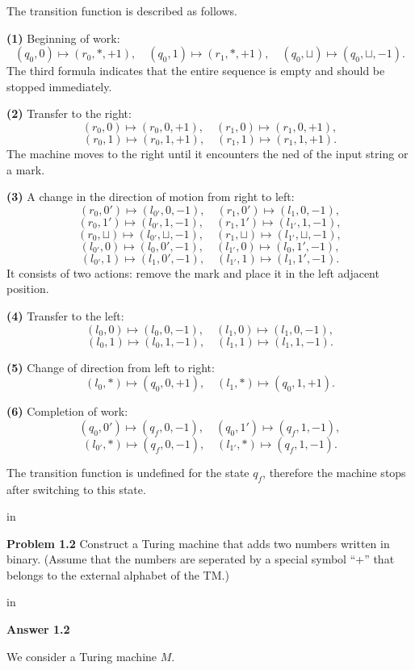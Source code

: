 \documentclass[11pt]{article}
\begin{document}
\newpage
The transition function is described as follows.

{\bf (1)} Beginning of work: 
$$
(q_0, 0) \mapsto (r_0, \ast, +1), \quad (q_0, 1)\mapsto (r_1, \ast, +1), \quad (q_0,\sqcup) \mapsto (q_0 ,\sqcup, -1).
$$
The third formula indicates that the entire sequence is empty and should be stopped immediately.

{\bf (2)} Transfer to the right: 
$$
(r_0, 0) \mapsto (r_0, 0, +1), \quad (r_1, 0)\mapsto (r_1, 0, +1),
$$
$$
(r_0, 1) \mapsto (r_0, 1, +1), \quad (r_1, 1)\mapsto (r_1, 1, +1).
$$
The machine moves to the right until it encounters the ned of the input string or a mark.

{\bf (3)} A change in the direction of motion from right to left:
$$
(r_0, 0') \mapsto (l_{0'}, 0, -1), \quad (r_1, 0')\mapsto (l_1, 0, -1),
$$
$$
(r_0, 1') \mapsto (l_{0'}, 1, -1), \quad (r_1, 1')\mapsto (l_{1'}, 1, -1),
$$
$$
(r_0, \sqcup) \mapsto (l_{0'}, \sqcup, -1), \quad (r_1, \sqcup)\mapsto (l_{1'}, \sqcup, -1),
$$
$$
(l_{0'}, 0) \mapsto (l_{0}, 0', -1), \quad (l_{1'}, 0)\mapsto (l_{0}, 1', -1),
$$
$$
(l_{0'}, 1) \mapsto (l_{1}, 0', -1), \quad (l_{1'}, 1)\mapsto (l_{1}, 1', -1).
$$
It consists of two actions: remove the mark and place it in the left adjacent position.

{\bf (4)} Transfer to the left: 
$$
(l_{0}, 0) \mapsto (l_{0}, 0, -1), \quad (l_{1}, 0)\mapsto (l_{1}, 0, -1),
$$
$$
(l_{0}, 1) \mapsto (l_{0}, 1, -1), \quad (l_{1}, 1)\mapsto (l_{1}, 1, -1).
$$

{\bf (5)} Change of direction from left to right:
$$
(l_{0}, \ast) \mapsto (q_{0},0, +1), \quad (l_{1}, \ast)\mapsto (q_{0}, 1, +1).
$$

{\bf (6)} Completion of work:
$$
(q_{0}, 0') \mapsto (q_{f},0, -1), \quad (q_{0}, 1')\mapsto (q_{f}, 1, -1),
$$
$$
(l_{0'}, \ast) \mapsto (q_{f},0, -1), \quad (l_{1'}, \ast)\mapsto (q_{f}, 1, -1).
$$

The transition function is undefined for the state $q_f$, therefore the machine stops after switching to this state.

 in

\newpage
{\bf Problem 1.2} Construct a Turing machine that adds two numbers written in binary. (Assume that the numbers are seperated by a special symbol ``+'' that belongs to the external alphabet
of the TM.)

 in

{\bf Answer 1.2 }

We consider a Turing machine $M$.
\end{document}

